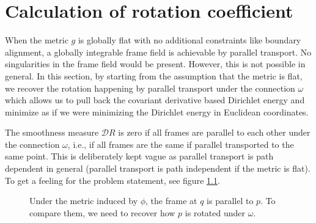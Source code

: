 \documentclass[../thesis.tex]{subfiles}
\begin{document}
\newcommand{\str}[1]{\textsc{#1}}
\newcommand{\var}[1]{\textit{#1}}
\newcommand{\op}[1]{\textsl{#1}}
\def \ifempty#1{\def\temp{#1} \ifx\temp\empty }
\newcommand{\msg}[2]{\ensuremath{\ifempty{#2} [\str{#1}] \else [\str{#1}, {#2}] \fi}}
\newcommand{\tup}[1]{\ensuremath{\langle #1 \rangle}}
\newcommand{\nil}{\ensuremath{\bot}}
\newcommand{\false}{\textsc{false}\xspace}
\newcommand{\true}{\textsc{true}\xspace}

\newcommand\lastts{\var{lastts}\xspace}
\newcommand\nextts{\var{nextts}\xspace}
\newcommand\trusted{\var{trusted}\xspace}
\newcommand\newepoch{\var{newepoch}\xspace}
\newcommand\leader{\var{leader}\xspace}
\newcommand\ts{\var{ts}\xspace}
\newcommand{\CK}{\ensuremath{\mathcal{K}}\xspace}
\newcommand{\CP}{\ensuremath{\mathcal{P}}\xspace}
\newcommand{\CQ}{\ensuremath{\mathcal{Q}}\xspace}


\chapter{Calculation of rotation coefficient}
\label{ch:calculation}
When the metric $g$ is globally flat with no additional constraints like
boundary alignment, a globally integrable frame field is achievable
by parallel transport. No singularities in the frame field would be present.
However, this is not possible in general.
In this section, by starting from the assumption that the metric
is flat, we recover the rotation happening by parallel transport under
the connection $\omega$ which allows us
to pull back the covariant derivative based Dirichlet energy
and minimize as if we were minimizing
the Dirichlet energy in Euclidean coordinates.

The smoothness measure $\mathcal{D}R$ is zero if all frames are parallel
to each other under the connection $\omega$, i.e., if all frames
are the same if parallel transported to the same point.
This is deliberately kept vague as parallel transport is path
dependent in general (parallel transport is path independent if the metric is flat).
To get a feeling for the problem statement, see figure \ref{fig:rotation}.

\begin{figure}[htb]
  \centering
  \def\svgwidth{20em}
  
  \caption{Under the metric induced by $\phi$, the frame at $q$ is parallel to $p$.
  To compare them, we need to recover how $p$ is rotated under $\omega$.}
  \label{fig:rotation}
\end{figure}
\end{document}
